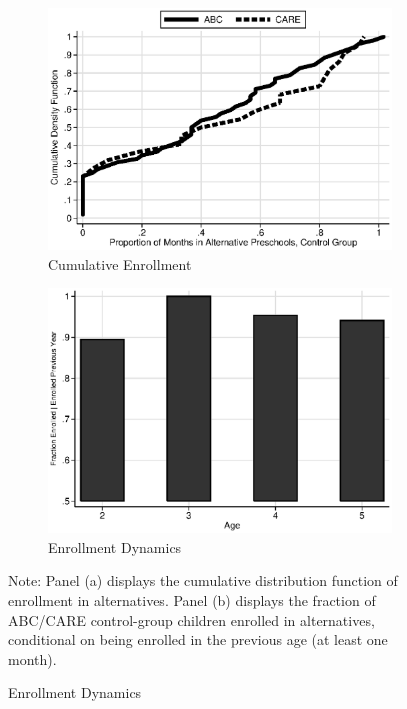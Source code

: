 \begin{figure}
\centering
\caption{Control Substitution Characteristics, ABC/CARE Control Group}\label{fig:control-sub}
\begin{subfigure}[h]{0.49\textwidth}
	\centering
	\caption{Cumulative Enrollment} \label{fig:treatsubcare}
	\includegraphics[width=\textwidth]{../output/abccare_controlcontamination.eps}
\end{subfigure}
\begin{subfigure}[h]{0.49\textwidth}
	\centering
	\caption{Enrollment Dynamics} \label{fig:proportion-alt-pre}
	\includegraphics[width=\textwidth]{../output/abccare_Vprobs.eps}
\end{subfigure}%
\footnotesize \justify
Note: Panel (a) displays the cumulative distribution function of enrollment in alternatives. Panel (b) displays the fraction of ABC/CARE control-group children enrolled in alternatives, conditional on being enrolled in the previous age (at least one month).\\
\end{figure}

